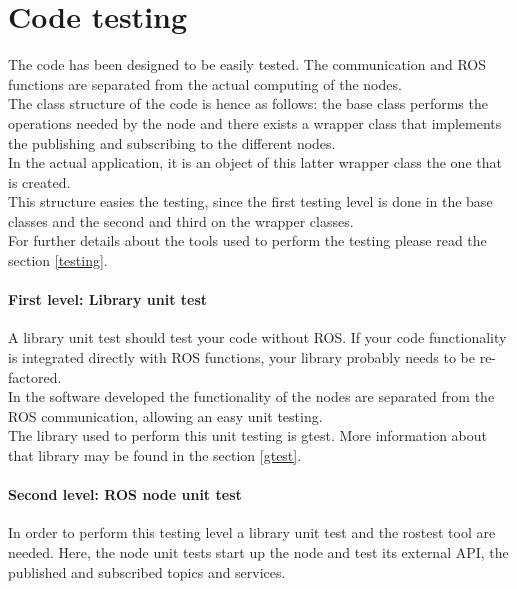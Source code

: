 \chapter{Code testing}
The code has been designed to be easily tested. The communication and ROS functions are separated from the actual computing of the nodes. 
\\

The class structure of the code is hence as follows: the base class performs the operations needed by the node and there exists a wrapper class that implements the publishing and subscribing to the different nodes. \\

In the actual application, it is an object of this latter wrapper class the one that is created. 
\\

This structure easies the testing, since the first testing level is done in the base classes and the second and third on the wrapper classes.
\\

For further details about the tools used to perform the testing please read the section \ref{testing}.
\\

	\subsubsection{First level: Library unit test}
A library unit test should test your code without ROS. If your code functionality is integrated directly with ROS functions, your library probably needs to be re-factored. 
\\

In the software developed the functionality of the nodes are separated from the ROS communication, allowing an easy unit testing. \\

The library used to perform this unit testing is gtest. More information about that library may be found in the section \ref{gtest}.

	\subsubsection{Second level: ROS node unit test}
In order to perform this testing level a library unit test and the rostest tool are needed. Here, the node unit tests start up the node and test its external API, the published and subscribed topics and services. 
\\

